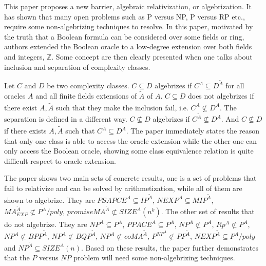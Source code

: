 \documentclass{article}
\begin{document}
This paper proposes a new barrier, algebraic relativization, or algebrization. It has shown that many open problems such as P versus NP, P versus RP etc., require some non-algebrizing techniques to resolve. In this paper, motivated by the truth that a Boolean formula can be considered over some fields or ring, authors extended the Boolean oracle to a low-degree extension over both fields and integers, $\mathbb{Z}$. Some concept are then clearly presented when one talks about inclusion and separation of complexity classes.

Let $C$ and $D$ be two complexity classes. $C \subseteq D$ algebrizes if $C^A \subseteq D^{\tilde{A}} $ for all oracles $A$ and all finite fields extensions of $\tilde{A}$ of $A$. $C \subseteq D$ does not algebrizes if there exist $A,\tilde{A}$ such that they make the inclusion fail, i.e. $C^A \not\subseteq D^{\tilde{A}}$. The separation is defined in a different way. $C \not\subseteq D$ algebrizes if $C^{\tilde{A}} \not\subseteq D^A$. And $C \not\subseteq D$ if there exists $A,\tilde{A}$ such that $C^{\tilde{A}} \subseteq D^A$. The paper immediately states the reason that only one class is able to access the oracle extension while the other one can only access the Boolean oracle, showing some class equivalence relation is quite difficult respect to oracle extension. 

The paper shows two main sets of concrete results, one is a set of problems that fail to relativize and can be solved by arithmetization, while all of them are shown to algebrize. They are $PSAPCE^A \subseteq IP^{\tilde{A}}$, $NEXP^A \subseteq MIP^{\tilde{A}}$, $MA^{\tilde{A}}_{EXP} \not\subset P^A/poly$, $promiseMA^{\tilde{A}} \not\subset SIZE^A(n^k)$. The other set of results that do not algebrize. They are $NP^{\tilde{A}} \subseteq P^A$, $PPACE^{\tilde{A}} \subseteq P^A$, $NP^A \not\subset P^{\tilde{A}}$, $Rp^A \not\subset P^{\tilde{A}}$, $NP^A \not\subset BPP^{\tilde{A}}$, $NP^A \not\subset BQP^{\tilde{A}}$, $NP^A \not\subset coMA^{\tilde{A}}$, $P^{NP^A}\not\subset PP^{\tilde{A}}$, $NEXP^{\tilde{A}} \subseteq P^A/poly$ and $NP^{\tilde{A}} \subseteq SIZE^A(n)$. Based on these results, the paper further demonstrates that the $P$ versus $NP$ problem will need some non-algebrizing techniques. 
\end{document}
